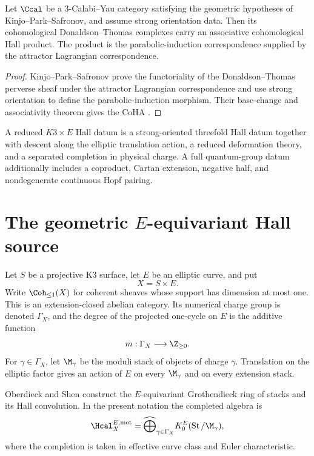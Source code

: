 \begin{theorem}
Let $\Ccal$ be a $3$-Calabi--Yau category satisfying the geometric hypotheses of Kinjo--Park--Safronov, and assume strong orientation data.  Then its cohomological Donaldson--Thomas complexes carry an associative cohomological Hall product.  The product is the parabolic-induction correspondence supplied by the attractor Lagrangian correspondence.
\end{theorem}
\begin{proof}
Kinjo--Park--Safronov prove the functoriality of the Donaldson--Thomas perverse sheaf under the attractor Lagrangian correspondence and use strong orientation to define the parabolic-induction morphism.  Their base-change and associativity theorem gives the CoHA \cite{KPS}.
\end{proof}

\begin{definition}
A reduced $K3\times E$ Hall datum is a strong-oriented threefold Hall datum together with descent along the elliptic translation action, a reduced deformation theory, and a separated completion in physical charge.  A full quantum-group datum additionally includes a coproduct, Cartan extension, negative half, and nondegenerate continuous Hopf pairing.
\end{definition}

\chapter{The geometric \texorpdfstring{$E$}{E}-equivariant Hall source}
Let $S$ be a projective K3 surface, let $E$ be an elliptic curve, and put
\[
 X=S\times E.
\]
Write $\Coh_{\leq1}(X)$ for coherent sheaves whose support has dimension at most one.  This is an extension-closed abelian category.  Its numerical charge group is denoted $\Gamma_X$, and the degree of the projected one-cycle on $E$ is the additive function
\[
 m:\Gamma_X\longrightarrow\Z_{\geq0}.
\]
For $\gamma\in\Gamma_X$, let $\M_\gamma$ be the moduli stack of objects of charge $\gamma$.  Translation on the elliptic factor gives an action of $E$ on every $\M_\gamma$ and on every extension stack.

Oberdieck and Shen construct the $E$-equivariant Grothendieck ring of stacks and its Hall convolution.  In the present notation the completed algebra is
\[
 \Hcal_X^{E,\mathrm{mot}}
 =\widehat\bigoplus_{\gamma\in\Gamma_X}
 K_0^E(\operatorname{St}/\M_\gamma),
\]
where the completion is taken in effective curve class and Euler characteristic.

